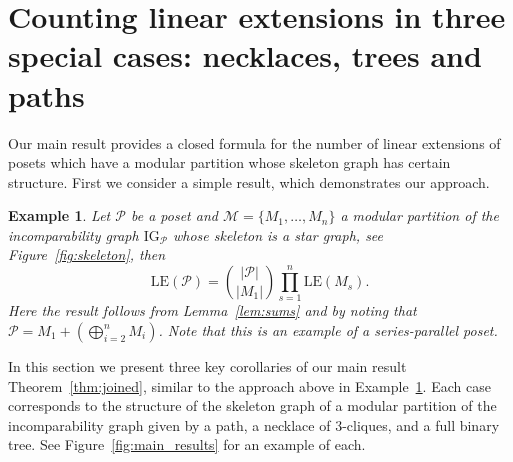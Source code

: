 \documentclass[9pt,a4paper,oneside]{article}
\newtheorem{example}[theorem]{Example}
\newcommand{\cM}{\mathcal{M}}
\newcommand{\cP}{\mathcal{P}}
\newcommand{\IG}{\mathrm{IG}}
\newcommand{\lex}{\mathrm{LE}}
\begin{document}
\section{Counting linear extensions in three special cases: necklaces, trees and paths}\label{sec:necktreepath}
Our main result provides a closed formula for the number of linear extensions of posets which have a modular partition whose skeleton graph has certain structure.
First we consider a simple result, which demonstrates our approach.
\begin{example}\label{ex:star}
	Let $\mathcal{P}$ be a poset and $\cM=\{M_1,\ldots,M_n\}$ a modular partition of the incomparability graph $\IG_\cP$ whose skeleton is a star graph, see Figure~\ref{fig:skeleton},
	then
	$$\lex(\mathcal{P}) =  \binom{|\mathcal{P}|}{|M_1|}\prod_{s=1}^{n} \lex(M_s). $$
    Here the result follows from Lemma~\ref{lem:sums} and by noting that $\mathcal{P}=M_1+\left(\bigoplus_{i=2}^n M_i\right)$.
    Note that this is an example of a series-parallel poset.
\end{example}

In this section we present three key corollaries of our main result Theorem~\ref{thm:joined}, similar to the approach above in Example~\ref{ex:star}. Each case corresponds to the structure of the skeleton graph of a modular partition of the incomparability graph given by a path, a necklace of $3$-cliques, and a full binary tree. See Figure~\ref{fig:main_results} for an example of each.
\end{document}
